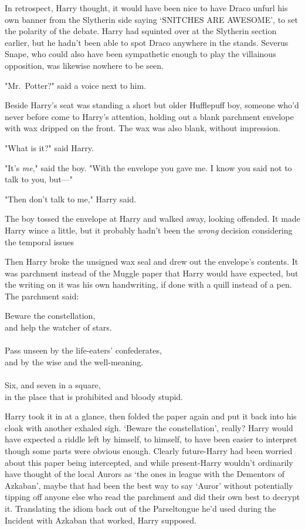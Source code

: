In retrospect, Harry thought, it would have been nice to have Draco unfurl his
own banner from the Slytherin side saying `SNITCHES ARE AWESOME', to set the
polarity of the debate. Harry had squinted over at the Slytherin section
earlier, but he hadn't been able to spot Draco anywhere in the stands. Severus
Snape, who could also have been sympathetic enough to play the villainous
opposition, was likewise nowhere to be seen.

"Mr.~Potter?" said a voice next to him.

Beside Harry's seat was standing a short but older Hufflepuff boy, someone
who'd never before come to Harry's attention, holding out a blank parchment
envelope with wax dripped on the front. The wax was also blank, without
impression.

"What is it?" said Harry.

"It's \emph{me}," said the boy. "With the envelope you gave me. I know you said
not to talk to you, but—"

"Then don't talk to me," Harry said.

The boy tossed the envelope at Harry and walked away, looking offended. It made
Harry wince a little, but it probably hadn't been the \emph{wrong} decision
considering the temporal issues{\el}

Then Harry broke the unsigned wax seal and drew out the envelope's contents. It
was parchment instead of the Muggle paper that Harry would have expected, but
the writing on it was his own handwriting, if done with a quill instead of a
pen. The parchment said:

\begin{writtenNote}
Beware the constellation,\\
and help the watcher of stars.\\
\\
Pass unseen by the life-eaters' confederates,\\
and by the wise and the well-meaning.\\
\\
Six, and seven in a square,\\
in the place that is prohibited and bloody stupid.
\end{writtenNote}

Harry took it in at a glance, then folded the paper again and put it back into
his cloak with another exhaled sigh. `Beware the constellation', really? Harry
would have expected a riddle left by himself, to himself, to have been easier
to interpret{\el} though some parts were obvious enough. Clearly
future-Harry had been worried about this paper being intercepted, and while
present-Harry wouldn't ordinarily have thought of the local Aurors as `the ones
in league with the Dementors of Azkaban', maybe that had been the best way to
say `Auror' without potentially tipping off anyone else who read the parchment
and did their own best to decrypt it. Translating the idiom back out of the
Parseltongue he'd used during the Incident with Azkaban{\el} that worked,
Harry supposed.

